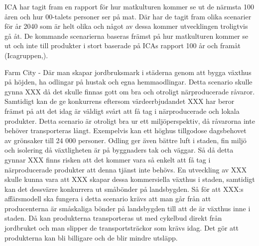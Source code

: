 \documentclass[10pt,a4paper,oneside]{article}
\begin{document}
ICA har tagit fram en rapport för hur matkulturen kommer se ut de närmsta 100 åren och hur 00-talets personer ser på mat. Där har de tagit fram olika scenarier för år 2040 som är helt olika och något av dessa kommer utvecklingen troligtvis gå åt. De kommande scenarierna baseras främst på hur matkulturen kommer se ut och inte till produkter i stort baserade på ICAs rapport 100 år och framåt (Icagruppen,). 

Farm City - Där man skapar jordbruksmark i städerna genom att bygga växthus på höjden, ha odlingar på hustak och egna hemmaodlingar. Detta scenario skulle gynna XXX då det skulle finnas gott om bra och otroligt närproducerade råvaror. Samtidigt kan de ge konkurrens eftersom värdeerbjudandet XXX har beror främst på att det idag är väldigt svårt att få tag i närproducerade och lokala produkter. Detta scenario är otroligt bra ur ett miljöperspektiv, då råvarorna inte behöver transporteras långt. Exempelvis kan ett höghus tillgodose dagsbehovet av grönsaker till 24 000 personer. Odling ger även bättre luft i staden, fin miljö och isolering då växtligheten är på byggnaders tak och väggar. Så då detta gynnar XXX finns risken att det kommer vara så enkelt att få tag i närproducerade produkter att denna tjänst inte behövs. En utveckling av XXX skulle kunna vara att XXX skapar dessa kommersiella växthus i staden, samtidigt kan det dessvärre konkurrera ut småbönder på landsbygden. Så för att XXX:s affärsmodell ska fungera i detta scenario krävs att man går från att producenterna är småskaliga bönder på landsbygden till att de är växthus inne i staden. Då kan produkterna transporteras ut med cykelbud direkt från jordbruket och man slipper de transportsträckor som krävs idag. Det gör att produkterna kan bli billigare och de blir mindre utsläpp. 
\end{document}
